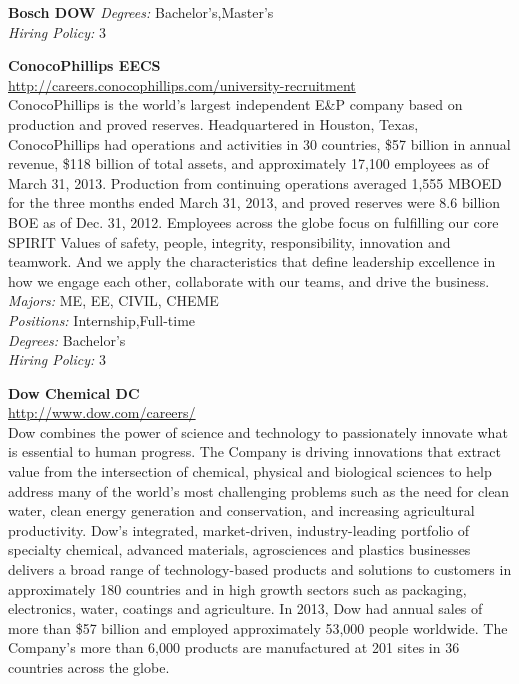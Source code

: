 \documentclass[twoside]{article}
\begin{document}
\begin{center}
\begin{multicols}{2}
\begin{minipage}{.95\columnwidth}{\Large\bf Bosch \hfill DOW}
    \emph{Degrees:} Bachelor's,Master's\\
    \emph{Hiring Policy:} 3\\
\end{minipage}
 \begin{minipage}{.95\columnwidth}{\Large\bf ConocoPhillips \hfill EECS}\\
    \url{http://careers.conocophillips.com/university-recruitment}\\
    ConocoPhillips is the world’s largest independent E\&P company based on production and proved reserves. Headquartered in Houston, Texas, ConocoPhillips had operations and activities in 30 countries, \$57 billion in annual revenue, \$118 billion of total assets, and approximately 17,100 employees as of March 31, 2013. Production from continuing operations averaged 1,555 MBOED for the three months ended March 31, 2013, and proved reserves were 8.6 billion BOE as of Dec. 31, 2012. Employees across the globe focus on fulfilling our core SPIRIT Values of safety, people, integrity, responsibility, innovation and teamwork. And we apply the characteristics that define leadership excellence in how we engage each other, collaborate with our teams, and drive the business.\\
    \emph{Majors:} ME, EE, CIVIL, CHEME\\
    \emph{Positions:} Internship,Full-time\\
    \emph{Degrees:} Bachelor's\\
    \emph{Hiring Policy:} 3\\
\end{minipage}
 \begin{minipage}{.95\columnwidth}{\Large\bf Dow Chemical \hfill DC}\\
    \url{http://www.dow.com/careers/}\\
    Dow combines the power of science and technology to passionately innovate what is essential to human progress. The Company is driving innovations that extract value from the intersection of chemical, physical and biological sciences to help address many of the world's most challenging problems such as the need for clean water, clean energy generation and conservation, and increasing agricultural productivity. Dow's integrated, market-driven, industry-leading portfolio of specialty chemical, advanced materials, agrosciences and plastics businesses delivers a broad range of technology-based products and solutions to customers in approximately 180 countries and in high growth sectors such as packaging, electronics, water, coatings and agriculture. In 2013, Dow had annual sales of more than \$57 billion and employed approximately 53,000 people worldwide. The Company's more than 6,000 products are manufactured at 201 sites in 36 countries across the globe.\\

\end{minipage}
\end{multicols}
\end{center}
\end{document}
